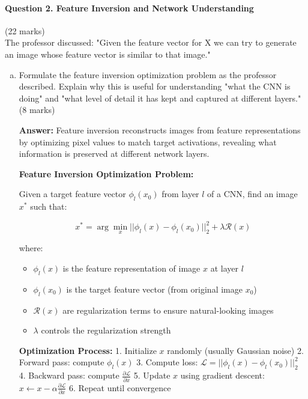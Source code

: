 \documentclass[12pt]{article}
\newcommand{\answer}[1]{{\color{answercolor}\textbf{Answer:} #1}}
\newcommand{\explanation}[1]{{\color{explanationcolor}#1}}
\begin{document}
\newpage
\paragraph{Question 2. Feature Inversion and Network Understanding}{\hfill (22 marks)}\\
The professor discussed: "Given the feature vector for X we can try to generate an image whose feature vector is similar to that image."

\begin{enumerate}[(a)]
    \item Formulate the feature inversion optimization problem as the professor described. Explain why this is useful for understanding "what the CNN is doing" and "what level of detail it has kept and captured at different layers." \hfill (8 marks)
    
    \answer{Feature inversion reconstructs images from feature representations by optimizing pixel values to match target activations, revealing what information is preserved at different network layers.}
    
    \explanation{
    \textbf{Feature Inversion Optimization Problem:}
    
    Given a target feature vector $\phi_l(x_0)$ from layer $l$ of a CNN, find an image $x^*$ such that:
    
    $$x^* = \arg\min_x ||\phi_l(x) - \phi_l(x_0)||_2^2 + \lambda \mathcal{R}(x)$$
    
    where:
    \begin{itemize}
        \item $\phi_l(x)$ is the feature representation of image $x$ at layer $l$
        \item $\phi_l(x_0)$ is the target feature vector (from original image $x_0$)
        \item $\mathcal{R}(x)$ are regularization terms to ensure natural-looking images
        \item $\lambda$ controls the regularization strength
    \end{itemize}
    
    \textbf{Optimization Process:}
    1. Initialize $x$ randomly (usually Gaussian noise)
    2. Forward pass: compute $\phi_l(x)$
    3. Compute loss: $\mathcal{L} = ||\phi_l(x) - \phi_l(x_0)||_2^2$
    4. Backward pass: compute $\frac{\partial \mathcal{L}}{\partial x}$
    5. Update $x$ using gradient descent: $x \leftarrow x - \alpha \frac{\partial \mathcal{L}}{\partial x}$
    6. Repeat until convergence
    
}
\end{enumerate}
\end{document}
